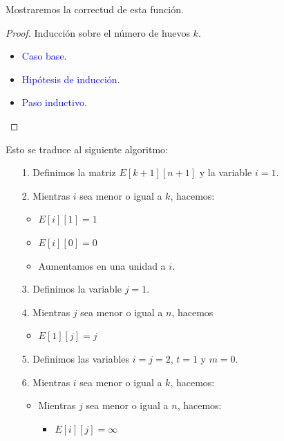 \documentclass[letterpaper,11pt]{article}
\begin{document}
\begin{enumerate}
    Mostraremos la correctud de esta función.
    \begin{proof}
        Inducción sobre el número de huevos $k$.
        \begin{itemize}
            \item \textcolor{blue}{Caso base}.

            \item \textcolor{blue}{Hipótesis de inducción}.

            \item \textcolor{blue}{Paso inductivo}.
        \end{itemize}
    \end{proof}

    Esto se traduce al siguiente algoritmo:
    \begin{itemize}
        \item[1.] Definimos la matriz $E[k+1][n+1]$ y la variable $i=1$.

        \item[2.] Mientras $i$ sea menor o igual a $k$, hacemos:
        \begin{itemize}
            \item $E[i][1] = 1$
            \item $E[i][0] = 0$
            \item Aumentamos en una unidad a $i$.
        \end{itemize}

        \item[3.] Definimos la variable $j = 1$.
        
        \item[4.] Mientras $j$ sea menor o igual a $n$, hacemos 
        \begin{itemize}
            \item $E[1][j] = j$
        \end{itemize}

        \item[5.] Definimos las variables $i = j = 2$, $t = 1$ y $m = 0$.

        \item[6.] Mientras $i$ sea menor o igual a $k$, hacemos:
        \begin{itemize}
            \item Mientras $j$ sea menor o igual a $n$, hacemos:
            \begin{itemize}
                \item $E[i][j] = \infty$


\end{itemize}
\end{itemize}
\end{itemize}
\end{enumerate}
\end{document}
